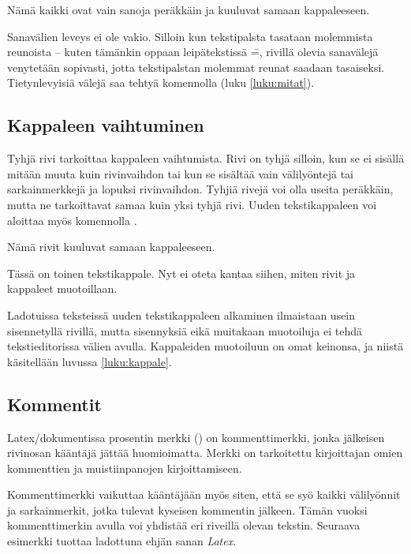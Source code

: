 \begin{tulossis}
  Nämä kaikki ovat vain sanoja peräkkäin ja kuuluvat samaan
  kappaleeseen.
\end{tulossis}

Sanavälien leveys ei ole vakio. Silloin kun tekstipalsta tasataan
molemmista reunoista -- kuten tämänkin oppaan leipätekstissä \==,
rivillä olevia sanavälejä venytetään sopivasti, jotta tekstipalstan
molemmat reunat saadaan tasaiseksi. Tietynlevyisiä välejä saa tehtyä
komennolla  (luku \ref{luku:mitat}).

\subsection{Kappaleen vaihtuminen}

Tyhjä rivi tarkoittaa kappaleen vaihtumista. Rivi on tyhjä silloin, kun
se ei sisällä mitään muuta kuin rivinvaihdon tai kun se sisältää vain
välilyöntejä tai sarkainmerkkejä ja lopuksi rivinvaihdon. Tyhjiä rivejä
voi olla useita peräkkäin, mutta ne tarkoittavat samaa kuin yksi tyhjä
rivi. Uuden tekstikappaleen voi aloittaa myös komennolla .

\begin{koodilohkosis}
  Nämä rivit kuuluvat
  samaan kappaleeseen.

  Tässä on toinen tekstikappale.
  Nyt ei oteta kantaa siihen, miten
  rivit ja kappaleet muotoillaan.
\end{koodilohkosis}

Ladotuissa teksteissä uuden tekstikappaleen alkaminen ilmaistaan usein
sisennetyllä rivillä, mutta sisennyksiä eikä muitakaan muotoiluja ei
tehdä tekstieditorissa välien avulla. Kappaleiden muotoiluun on omat
keinonsa, ja niistä käsitellään luvussa \ref{luku:kappale}.

\subsection{Kommentit}

Latex\-/dokumentissa prosentin merkki (\koodi{\%}) on kommenttimerkki,
jonka jälkeisen rivin\-osan kääntäjä jättää huomioimatta. Merkki on
tarkoitettu kirjoittajan omien kommenttien ja muistiinpanojen
kirjoittamiseen.

\begin{koodilohkosis}
\end{koodilohkosis}

Kommenttimerkki vaikuttaa kääntäjään myös siten, että se syö kaikki
välilyönnit ja sarkainmerkit, jotka tulevat kyseisen kommentin jälkeen.
Tämän vuoksi kommenttimerkin avulla voi yhdistää eri riveillä olevan
tekstin. Seuraava esimerkki tuottaa ladottuna ehjän sanan \emph{Latex}.

